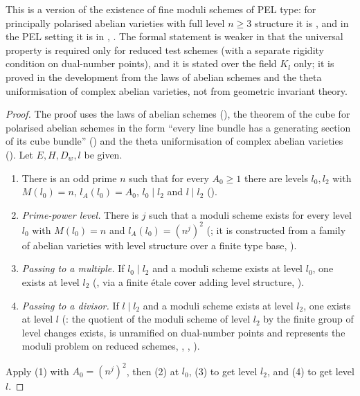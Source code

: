 \begin{remark}
This is a version of the existence of fine moduli schemes of PEL type: for principally polarised abelian varieties
with full level $n\ge3$ structure it is \cite[Theorem~7.9]{MumfordFogartyKirwan1994}, and in the PEL setting it is in
\cite[\S5]{Kottwitz1992}, \cite[Ch.~1]{Lan2013}. The formal statement is weaker in that the universal property is
required only for reduced test schemes (with a separate rigidity condition on dual-number points), and it is
stated over the field $K_l$ only; it is proved in the development from the laws of abelian schemes and the theta
uniformisation of complex abelian varieties, not from geometric invariant theory.
\end{remark}

\begin{proof}
The proof uses the laws of abelian schemes
(), the theorem of the cube for polarised abelian schemes in
the form ``every line bundle has a generating section of its cube bundle''
() and the theta uniformisation of complex abelian varieties
(). Let $E,H,D_w,l$ be given.
\begin{enumerate}[label=(\arabic*)]
\item There is an odd prime $n$ such that for every $A_0\ge1$ there are levels $l_0,l_2$ with $M(l_0)=n$, $l_A(l_0)=A_0$,
$l_0\mid l_2$ and $l\mid l_2$ ().
\item \emph{Prime-power level.} There is $j$ such that a moduli scheme exists for every level $l_0$ with $M(l_0)=n$ and
$l_A(l_0)=(n^j)^2$ (; it is constructed from a family of
abelian varieties with level structure over a finite type base, ).
\item \emph{Passing to a multiple.} If $l_0\mid l_2$ and a moduli scheme exists at level $l_0$, one exists at level $l_2$
(, via a finite \'etale cover adding level structure,
).
\item \emph{Passing to a divisor.} If $l\mid l_2$ and a moduli scheme exists at level $l_2$, one exists at level $l$
(: the quotient of the moduli scheme of level $l_2$ by the
finite group of level changes exists, is unramified on dual-number points and represents the moduli problem on reduced
schemes, ,
,
).
\end{enumerate}
Apply (1) with $A_0=(n^j)^2$, then (2) at $l_0$, (3) to get level $l_2$, and (4) to get level $l$.
\end{proof}

